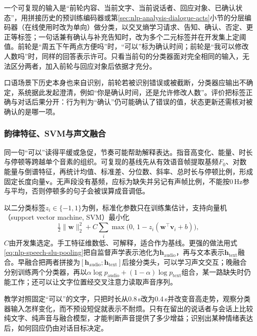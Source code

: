 一个可复现的输入是“前轮内容、当前文字、当前说话者、回应对象、已确认状态”，用拼接历史的预训练编码器或第\ref{sec:nlp-analysis-dialogue-acts}小节的分层编码器（在线使用时改为单向）做分类，以交叉熵学习请求、告知、确认、否定、更正等标签；一句话兼有确认与补充告知时，改为多个二元标签并在开发集上定阈值。前轮是“周五下午两点方便吗”时，“可以”标为确认时间；前轮是“我可以修改人数吗”时，同样的回答表示许可。只看当前句的分类器面对完全相同的输入，无法区分两者，加入前轮与回应对象后依据才充分。

口语场景下历史本身也来自识别，前轮若被识别错误或被截断，分类器应输出不确定，系统据此发起澄清，例如“你是确认时间，还是允许修改人数”。评价把标签正确与对话后果分开：行为判为“确认”仍可能确认了错误的值，状态更新还需核对被确认的是哪一项。

\subsubsection{韵律特征、SVM与声文融合}
\label{sec:nlp-speech-prosody-classification}

同一句“可以”读得平缓或急促，节奏可能帮助解释表达。指音高变化、能量、时长与停顿等跨越单个音素的组织。可复现的基线先从有效语音帧提取基频$F_0$、对数能量与倒谱特征，再统计均值、标准差、分位数、斜率、总时长与停顿比例，形成固定长度向量$\bm{v}$。无声段没有基频，应标为缺失并另记有声帧比例，不能按0\,Hz参与平均，否则停顿多的句子会被误算成音调低。

以二分类标签$z_i\in\{-1,1\}$为例，标准化参数只在训练集估计，支持向量机（support vector machine, SVM）最小化
\[
  \tfrac12\lVert\bm{w}\rVert_2^2+C\sum_i\max\bigl(0,\,1-z_i(\bm{w}^{\top}\bm{v}_i+b)\bigr),
\]
$C$由开发集选定。手工特征维数低、可解释，适合作为基线。更强的做法用式\eqref{eq:nlp-speech-slu-pooling}把自监督声学表示池化为$\bm{h}_{\mathrm{audio}}$，再与文本表示$\bm{h}_{\mathrm{text}}$融合。早融合把两者拼接为$[\bm{h}_{\mathrm{audio}};\bm{h}_{\mathrm{text}}]$后接分类头，可以学习声文交互；晚融合分别训练两个分类器，再以$\alpha\log p_{\mathrm{audio}}+(1-\alpha)\log p_{\mathrm{text}}$组合，某一路缺失时仍能工作；还可以让文字位置经交叉注意力读取声音序列。

教学对照固定“可以”的文字，只把时长从0.8\,s改为0.4\,s并改变音高走势，观察分类器输入怎样变化，而不预设短促就表示不耐烦。只有在留出的说话者与会话上比较纯文字、纯声音与融合模型，才能判断声音提供了多少增益；识别出某种情绪表达后，如何回应仍由对话目标决定。
